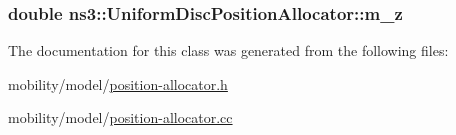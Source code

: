 \subsubsection[{\texorpdfstring{m\+\_\+z}{m_z}}]{\setlength{\rightskip}{0pt plus 5cm}double ns3\+::\+Uniform\+Disc\+Position\+Allocator\+::m\+\_\+z\hspace{0.3cm}{\ttfamily [private]}}\hypertarget{classns3_1_1UniformDiscPositionAllocator_aeaac1a59c1eb5af1433099616a97fc64}{}\label{classns3_1_1UniformDiscPositionAllocator_aeaac1a59c1eb5af1433099616a97fc64}


The documentation for this class was generated from the following files\+:\begin{DoxyCompactItemize}
\item 
mobility/model/\hyperlink{position-allocator_8h}{position-\/allocator.\+h}\item 
mobility/model/\hyperlink{position-allocator_8cc}{position-\/allocator.\+cc}\end{DoxyCompactItemize}
